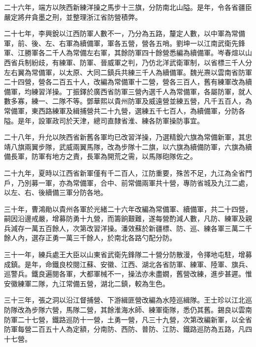 \begin{pinyinscope}
二十六年，端方以陜西新練洋操之馬步十三旗，分防南北山隘。是年，令各省疆臣嚴定將弁貪墨之刑，並整理浙江省防營積弊。

二十七年，李興銳以江西防軍人數不一，乃分為五路，釐定人數，以中軍為常備軍，前、後、左、右軍為續備軍，軍各五營，營各五哨。劉坤一以江南武衛先鋒軍、江勝軍各二千人為常備左右軍，其餘防軍四十餘營悉編為續備軍。岑春煊以山西省兵制紛歧，有練軍、防軍、晉威軍之判，乃仿北洋武衛軍制，以省標三千人分左右翼為常備軍，以太原、大同二鎮兵共練三千人為續備軍。魏光燾以雲南省防軍二十四營，營各二百五十人，改編為常備軍十二營，營各三百人，舊有練軍改為續備軍，均練習洋操。丁振鐸於廣西省防軍三營內選千人為常備軍，各屬防軍，就人數多寡，練一、二隊不等。鄧華熙以貴州防軍及威遠營並練五營，凡千五百人，為常備軍，東西路練軍及緝捕營共二十九營，選練五千七百人，為續備軍，分防各隘。是年，設軍政司於天津，總司直隸省淮、練各防軍操防事宜。

二十八年，升允以陜西省新舊各軍均已改習洋操，乃選精銳六旗為常備新軍，其忠靖八旗兩翼步隊，武威兩翼馬隊，改為步隊十二旗，以六旗為續備防軍，六旗為續備長軍，防軍有地方之責，長軍為開荒之需，以馬隊砲隊佐之。

二十九年，夏時以江西省新軍僅有千二百人，江防重要，殊苦不足，九江為全省門戶，乃別募一軍，亦為常備軍，合中、前常備兩軍共十營，專防省城及九江二處，以左、右、後續備三軍分防各地。

三十年，曹鴻勛以貴州各軍於光緒二十六年改編為常備軍、續備軍，共二十四營，嗣因沿邊戒嚴，增募防勇十九營，而籌餉艱難，遂每營酌減人數，凡防、練軍及親兵減存一萬五百餘人，次第改習洋操。潘效蘇於新疆標、防、巡、練各軍三萬二千餘人內，選存正勇一萬三千餘人，於南北各路勺配分防。

三十一年，練兵處王大臣以山東省武衛先鋒隊二十營分防散漫，令擇地屯駐，增募成鎮。是年，命鐵良校閱江蘇、安徽、江西、湖北各省防軍、練軍、陸軍、旗兵、巡警兵。鐵良遍閱各軍，大都軍械不一，操法亦未盡嫺，舊營改練，進步甚遲。惟安徽練軍二隊，九江常備五營，湖北二鎮，較為生色。

三十三年，張之洞以沿江督捕營、下游緝匪營改編為水陸巡緝隊。王士珍以江北巡防隊改為步隊六營，馬隊二營，其餘淮海水師、練軍衛隊，悉仍其舊。錫良以雲南防軍二十七營，鐵路巡防十一營，土勇一營，凡三十九營，次第改編新軍，以全省防軍每營二百五十人為定額，分南防、西防、普防、江防、鐵路巡防為五路，凡四十七營。


\end{pinyinscope}
